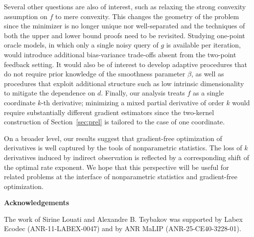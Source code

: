\documentclass{article}
\theoremstyle{definition}
\begin{document}

Several other questions are also of interest, such as relaxing the strong convexity
assumption on $f$ to mere convexity. This changes the geometry of the
problem since the minimizer is no longer unique nor
well-separated and the techniques of both the upper and lower
bound proofs need to be revisited. Studying one-point
oracle models, in which only a single noisy query of $g$
is available per iteration, would introduce additional
bias-variance trade-offs absent from the two-point feedback
setting. It would also be of interest to develop adaptive
procedures that do not require prior knowledge of the smoothness
parameter $\beta$, as well as procedures that exploit
additional structure such as low intrinsic dimensionality to
mitigate the dependence on $d$. Finally, our analysis treats $f$
as a single coordinate $k$-th derivative; minimizing a mixed
partial derivative of order $k$ would require substantially
different gradient estimators since the two-kernel construction
of Section~\ref{sec:prel} is tailored to the case of one coordinate.

On a broader level, our results suggest that gradient-free
optimization of derivatives is well captured by
the tools of nonparametric statistics. The loss of $k$
derivatives induced by indirect observation is reflected by a corresponding shift of the optimal rate exponent.
We hope that this perspective will be useful for related problems at
the interface of nonparametric statistics and gradient-free
optimization.

\vspace{6mm}

{\bf Acknowledgements}

\vspace{2mm}

The work of Sirine Louati and Alexandre B. Tsybakov was supported by Labex Ecodec (ANR-11-LABEX-0047) and by ANR MaLIP (ANR-25-CE40-3228-01). 


{  


  
} 
\end{document}
